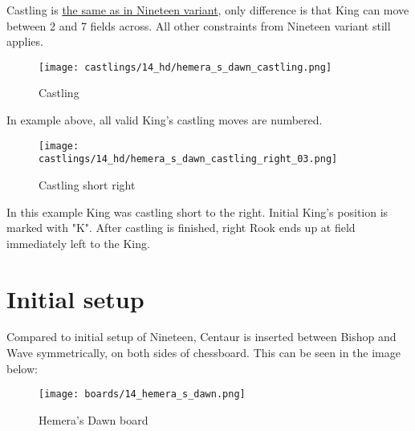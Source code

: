 Castling is
\hyperref[sec:Nineteen/Castling]{the same as in Nineteen variant},
only difference is that King can move
between 2 and 7 fields across. All other constraints from Nineteen variant still
applies.

\noindent
\begin{figure}[!h]
\texttt{[image: castlings/14\_hd/hemera\_s\_dawn\_castling.png]}
\caption{Castling}
\label{fig:hemera_s_dawn_castling}
\end{figure}

In example above, all valid King's castling moves are numbered.

\noindent
\begin{figure}[!h]
\texttt{[image: castlings/14\_hd/hemera\_s\_dawn\_castling\_right\_03.png]}
\caption{Castling short right}
\label{fig:hemera_s_dawn_castling_right_03}
\end{figure}

In this example King was castling short to the right. Initial King's position is
marked with "K". After castling is finished, right Rook ends up at field immediately
left to the King.

\clearpage %

\section*{Initial setup}
\label{sec:Hemera's Dawn/Initial setup}

Compared to initial setup of Nineteen, Centaur is inserted between Bishop and Wave
symmetrically, on both sides of chessboard. This can be seen in the image below:

\noindent
\begin{figure}[h]
\texttt{[image: boards/14\_hemera\_s\_dawn.png]}
\caption{Hemera's Dawn board}
\label{fig:14_hemera_s_dawn}
\end{figure}

\clearpage %
